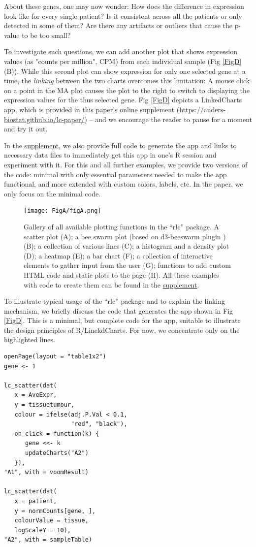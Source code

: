 \documentclass[twocolumn,10pt]{article}
\newcommand{\supplement}{\href{https://anders-biostat.github.io/lc-paper/}{supplement}}
\begin{document}
About these genes, one may now wonder: How does the difference in expression look like for every single patient? Is it consistent across all the patients or only detected in some of them? Are there any artifacts or outliers that cause the p-value to be too small?

To investigate such questions, we can add another plot that shows expression values (as "counts per million", CPM) from each individual sample (Fig \ref{FigD}(B)). While this second plot can show expression for only one selected gene at a time, the \emph{linking} between the two charts  overcomes this limitation: A mouse click on a point in the MA plot causes the plot to the right to switch to displaying the expression values for the thus selected gene. Fig \ref{FigD} depicts a LinkedCharts app, which is provided in this paper's online supplement (\url{https://anders-biostat.github.io/lc-paper/}) -- and we encourage the reader to pause for a moment and try it out. 

In the \supplement, we also provide full code to generate the app and links to necessary data files to immediately get this app in one's R session and experiment with it. For this and all further examples, we provide two versions of the code: minimal with only essential parameters needed to make the app functional, and more extended with custom colors, labels, etc. In the paper, we only focus on the minimal code.

\begin{figure}[b]
	\texttt{[image: FigA/figA.png]}
	\caption{Gallery of all available plotting functions in the ``rlc'' package. A scatter plot (A); a bee swarm plot (based on d3-beeswarm plugin \citep{lebeau_2017}) (B); a collection of various lines (C); a histogram and a density plot (D); a heatmap (E); a bar chart (F); a collection of interactive elements to gather input from the user (G); functions to add custom HTML code and static plots to the page (H). All these examples with code to create them can be found in the \supplement.}
	\label{FigA}
\end{figure}

To illustrate typical usage of the ``rlc'' package and to explain the linking mechanism, we briefly discuss the code that generates the app shown in Fig \ref{FigD}. This is a minimal, but complete code for the app, suitable to illustrate the design principles of R/LinekdCharts. For now, we concentrate only on the highlighted lines.

\begin{verbatim}
openPage(layout = "table1x2")
gene <- 1

lc_scatter(dat(
   x = AveExpr,
   y = tissuetumour,
   colour = ifelse(adj.P.Val < 0.1, 
                   "red", "black"),
   on_click = function(k) {
      gene <<- k
      updateCharts("A2")
   }),
"A1", with = voomResult)

lc_scatter(dat(
   x = patient,
   y = normCounts[gene, ],
   colourValue = tissue, 
   logScaleY = 10),
"A2", with = sampleTable)
\end{verbatim}
\end{document}
